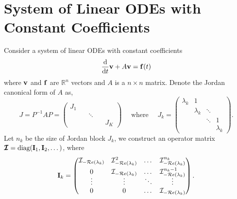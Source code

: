 \section{System of Linear ODEs with Constant Coefficients} \label{section:system-of-linear-odes-with-constant-coefficients}
    Consider a system of linear ODEs with constant coefficients 
    {
        \begin{equation}\label{eq:linear-system-master}
            \frac{\mathrm{d}}{\mathrm{d}t}\mathbf{v} + A\mathbf{v} = \mathbf{f}(t)
        \end{equation}
    }
    where $\mathbf{v}$ and $\mathbf{f}$ are $\mathbb{R}^n$ vectors and $A$ is a $n\times n$ matrix. Denote the Jordan canonical form of $A$ as,
    {
        \begingroup 
        \setlength\arraycolsep{1pt}
        \begin{equation}\label{eq:jordan-definition}
            J = P^{-1}AP= \begin{pmatrix}
                J_1 \quad & & \\
                & \ddots & \\
                & & \quad J_K
            \end{pmatrix}
            {\quad \text{ where }\quad }
            J_k = \begin{pmatrix}
                \lambda_k & 1\\[-0.75em]
                & \lambda_k & \ddots\\[-0.75em]
                & & \ddots & 1\\[-0.25em]
                & & & \lambda_k
            \end{pmatrix}.
        \end{equation}
        \endgroup
    }
    Let $n_k$ be the size of Jordan block $J_k$, we construct an operator matrix $\pmb{\mathcal{I}} = \text{diag}(\mathbf{I}_1, \mathbf{I}_2, \dots)$, where 
    {
        \begingroup 
        \setlength\arraycolsep{1pt}
        \begin{equation}\label{eq:operator-block}
            \mathbf{I}_k = \begin{pmatrix}
                \mathcal{I}_{-\mathcal{R}e\left(\lambda_k\right)} & \mathcal{I}_{-\mathcal{R}e\left(\lambda_k\right)}^2 & \dots &\mathcal{I}_{-\mathcal{R}e\left(\lambda_k\right)}^{n_k} \\[1ex]
                0 & \mathcal{I}_{-\mathcal{R}e\left(\lambda_k\right)} & \dots &\mathcal{I}_{-\mathcal{R}e\left(\lambda_k\right)}^{n_k-1} \\[-1ex]
                \vdots & \vdots & \ddots & \vdots \\
                0 & 0 & \dots & \mathcal{I}_{-\mathcal{R}e\left(\lambda_k\right)}
            \end{pmatrix}.
        \end{equation}
        \endgroup
    }
